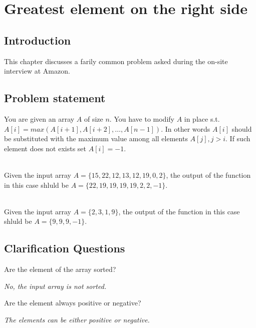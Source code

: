 %


\chapter{Greatest element on the right side}
\label{ch:greatest_right}
\section*{Introduction}
This chapter discusses a farily common problem asked during the on-site interview at Amazon.

\section{Problem statement}
\begin{exercise}
You are given an array $A$ of size $n$. You have to modify $A$ in place s.t. $A[i] = max(A[i+1], A[i+2],\ldots, A[n-1])$. In other words $A[i]$ should be substituted with  the maximum value among all elements $A[j], j > i$. If such element does not exists set $A[i] = -1$.

	\begin{example}
		\hfill \\
		Given the input array $A = \{15, 22, 12, 13, 12, 19, 0, 2\}$, the output of the function in this case shluld be  $A = \{22, 19, 19, 19, 19, 2, 2, -1\}$.
	\end{example}

	\begin{example}
		\hfill \\
		Given the input array $A = \{2, 3, 1, 9\}$, the output of the function in this case shluld be  $A = \{9, 9, 9, -1\}$.
\end{example}
\end{exercise}


\section{Clarification Questions}

\begin{QandA}
	\item Are the element of the array sorted?
	\begin{answered}
		\textit{No, the input array is not sorted.}
	\end{answered}
	
	\item Are the element always positive or negative?
	\begin{answered}
		\textit{The elements can be either positive or negative.}
	\end{answered}
	
\end{QandA}

